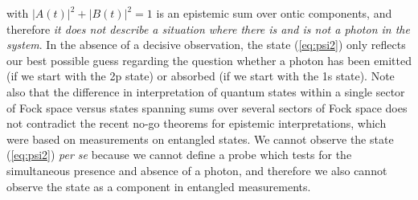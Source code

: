 \documentclass[final,3p,times,twocolumn]{elsarticle3}
\begin{document}
with $|A(t)|^2+|B(t)|^2=1$ is an epistemic sum over ontic components, and therefore
{\it it does not describe a situation where there is and is not a photon in the system}.
In the absence of a decisive observation, the state (\ref{eq:psi2}) only reflects 
our best possible guess regarding the question whether a photon has been emitted
(if we start with the 2p state) or absorbed (if we start with the 1s state). Note 
also that the difference in interpretation of quantum states within a single sector
of Fock space versus states spanning sums over several sectors of Fock space does not 
contradict the recent no-go theorems for epistemic interpretations, which were based
on measurements on entangled states. We cannot observe the 
state (\ref{eq:psi2}) {\it per se} because we cannot define a probe which
tests for the simultaneous presence and absence of a photon, and therefore
we also cannot observe the state as a component in entangled measurements. 
\end{document}
